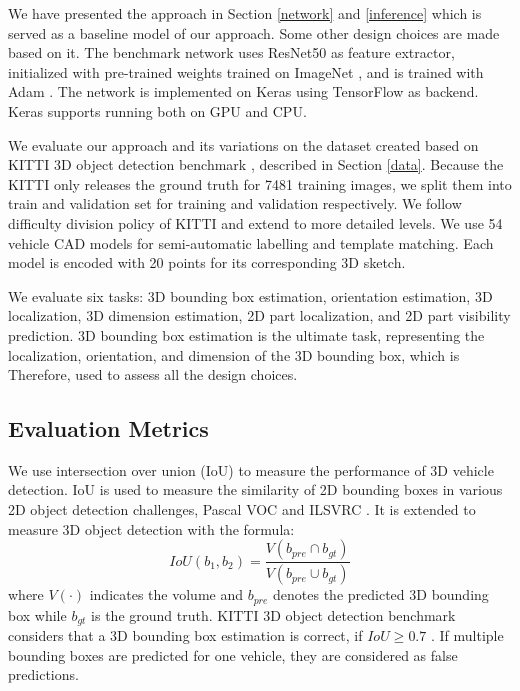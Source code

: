 \documentclass[a4paper,12pt]{article}
\begin{document}
We have presented the approach in Section \ref{network} and \ref{inference} which is served as a baseline model of our approach. Some other design choices are made based on it. The benchmark network uses ResNet50 \cite{DBLP:journals/corr/HeZRS15} as feature extractor, initialized with pre-trained weights trained on ImageNet \cite{DBLP:Russakovsky14}, and is trained with Adam \cite{DBLP:journals/corr/KingmaB14}. The network is implemented on Keras \cite{chollet2015keras} using TensorFlow \cite{tensorflow2015-whitepaper} as backend. Keras supports running both on GPU and CPU. 

We evaluate our approach and its variations on the dataset created based on KITTI 3D object detection benchmark \cite{Geiger2012CVPR}, described in Section \ref{data}. Because the KITTI only releases the ground truth for 7481 training images, we split them into train and validation set for training and validation respectively. We follow difficulty division policy of  KITTI and extend to more detailed levels. We use 54 vehicle CAD models \cite{NIPS2012_4562} for semi-automatic labelling and template matching. Each model is encoded with 20 points for its corresponding 3D sketch.

We evaluate six tasks: 3D bounding box estimation, orientation estimation, 3D localization, 3D dimension estimation, 2D part localization, and 2D part visibility prediction. 3D bounding box estimation is the ultimate task, representing the localization, orientation, and dimension of the 3D bounding box,  which is Therefore, used to assess all the design choices.
\subsection{Evaluation Metrics}
\label{eval_met}

We use intersection over union (IoU) to measure the performance of 3D vehicle detection. IoU is used to measure the similarity of 2D bounding boxes in various 2D object detection challenges, \eg Pascal VOC \cite{Everingham15} and ILSVRC \cite{DBLP:Russakovsky14}. It is extended to measure 3D object detection with the formula:
\begin{equation}
	IoU(b_1, b_2) = \frac{V(b_{pre}\cap b_{gt})}{V(b_{pre}\cup b_{gt})}
\end{equation}
where $V(\cdot)$ indicates the volume and $b_{pre}$ denotes the predicted 3D bounding box while $b_{gt}$ is the ground truth. KITTI 3D object detection benchmark considers that a 3D bounding box estimation is correct, if $IoU \geq 0.7$ \cite{Geiger2012CVPR}. If multiple bounding boxes are predicted for one vehicle, they are considered as false predictions. %
\end{document}

